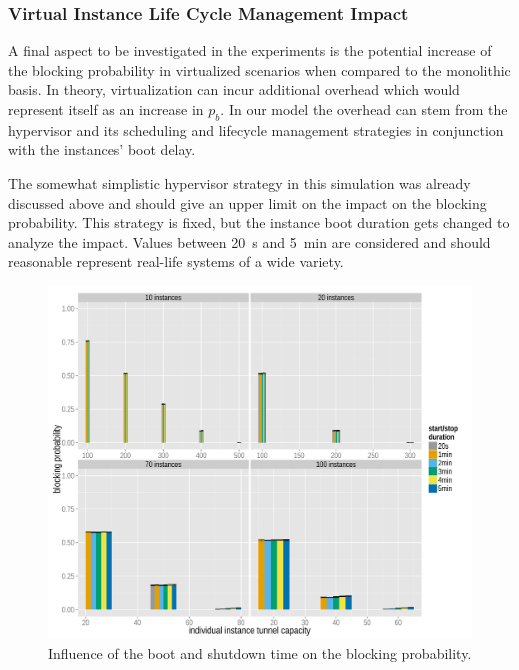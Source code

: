 \subsubsection{Virtual Instance Life Cycle Management Impact}


A final aspect to be investigated in the experiments is the potential increase of the blocking probability in virtualized scenarios when compared to the monolithic basis. In theory, virtualization can incur additional overhead which would represent itself as an increase in $p_b$. In our model the overhead can stem from the hypervisor and its scheduling  and lifecycle management strategies in conjunction with the instances' boot delay. 

The somewhat simplistic hypervisor strategy in this simulation was already discussed above and should give an upper limit on the impact on the blocking probability. This strategy is fixed, but the instance boot duration gets changed to analyze the impact. Values between \SI{20}{\second} and \SI{5}{\minute} are considered and should reasonable represent real-life systems of a wide variety.

\begin{figure}[htb]
	\centering
	\includegraphics[width=1.0\textwidth]{images/R-virtualized-startstop-blocking-barchart.pdf}
	\caption{Influence of the boot and shutdown time on the blocking probability.}
\label{c4:fig:blockprob-startstop-barchart}
\end{figure}

